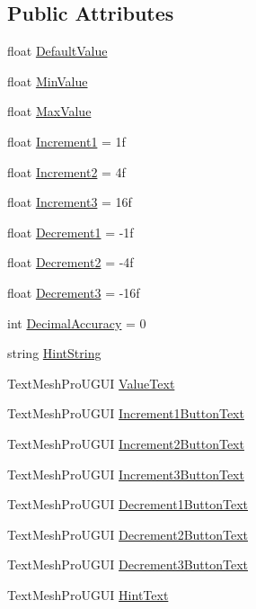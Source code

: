 \subsection*{Public Attributes}
\begin{DoxyCompactItemize}
\item 
float \mbox{\hyperlink{class_numeric_control_ui_a364ae2a0aac660f08b9a1e11c30f8d1d}{Default\+Value}}
\item 
float \mbox{\hyperlink{class_numeric_control_ui_a1b5a87a59a991fd86ac43cf307ef31e5}{Min\+Value}}
\item 
float \mbox{\hyperlink{class_numeric_control_ui_abea5d1fe4f626c1c6e28f79787f5b8b7}{Max\+Value}}
\item 
float \mbox{\hyperlink{class_numeric_control_ui_ac902f86a5846a21f8a59199e1c8e6d21}{Increment1}} = 1f
\item 
float \mbox{\hyperlink{class_numeric_control_ui_a4dc0c7082772f42ef9ddcae863c2dc2d}{Increment2}} = 4f
\item 
float \mbox{\hyperlink{class_numeric_control_ui_a7566ae406ed71a284164342567eb0094}{Increment3}} = 16f
\item 
float \mbox{\hyperlink{class_numeric_control_ui_ab8c218664ec27b8b0623a7d60bb4e2ca}{Decrement1}} = -\/1f
\item 
float \mbox{\hyperlink{class_numeric_control_ui_a855fcd77f32cfe2b6a25ebf03ac2e5d1}{Decrement2}} = -\/4f
\item 
float \mbox{\hyperlink{class_numeric_control_ui_a55693d2f583171375759278332669b4a}{Decrement3}} = -\/16f
\item 
int \mbox{\hyperlink{class_numeric_control_ui_a653ebdf7d80e0dbc9333d9c075258bdf}{Decimal\+Accuracy}} = 0
\item 
string \mbox{\hyperlink{class_numeric_control_ui_a20bd51b0903ca3b98ad639986e510d7a}{Hint\+String}}
\item 
Text\+Mesh\+Pro\+U\+G\+UI \mbox{\hyperlink{class_numeric_control_ui_a3a720216d8b23201f1fa31969104da88}{Value\+Text}}
\item 
Text\+Mesh\+Pro\+U\+G\+UI \mbox{\hyperlink{class_numeric_control_ui_ae3899a202f6c43282bc85877642ff3a5}{Increment1\+Button\+Text}}
\item 
Text\+Mesh\+Pro\+U\+G\+UI \mbox{\hyperlink{class_numeric_control_ui_a6fdc9705bbb38673ff8a9db702991d33}{Increment2\+Button\+Text}}
\item 
Text\+Mesh\+Pro\+U\+G\+UI \mbox{\hyperlink{class_numeric_control_ui_a7ad042c69fd8524be5a24dcfe550dc89}{Increment3\+Button\+Text}}
\item 
Text\+Mesh\+Pro\+U\+G\+UI \mbox{\hyperlink{class_numeric_control_ui_a8146152735bf1db9e4d8b1e30b27869e}{Decrement1\+Button\+Text}}
\item 
Text\+Mesh\+Pro\+U\+G\+UI \mbox{\hyperlink{class_numeric_control_ui_a80864db6311b50c928b7de9dc472a5dd}{Decrement2\+Button\+Text}}
\item 
Text\+Mesh\+Pro\+U\+G\+UI \mbox{\hyperlink{class_numeric_control_ui_aa929f1c88082d2d13f871a1771f88b36}{Decrement3\+Button\+Text}}
\item 
Text\+Mesh\+Pro\+U\+G\+UI \mbox{\hyperlink{class_numeric_control_ui_ae4d67252653e392dbb31ae60046b6090}{Hint\+Text}}
\end{DoxyCompactItemize}


